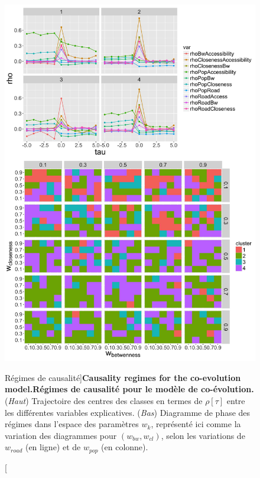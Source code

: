 \begin{figure}
	\includegraphics[width=\linewidth,height=0.93\textheight]{Figures/Final/7-2-2-fig-mesocoevolmodel-causality}
	\caption[Causality regimes][Régimes de causalité]{\textbf{Causality regimes for the co-evolution model.}\label{fig:mesocoevolmodel:causality}}{\textbf{Régimes de causalité pour le modèle de co-évolution.} (\textit{Haut}) Trajectoire des centres des classes en termes de $\rho[\tau]$ entre les différentes variables explicatives. (\textit{Bas}) Diagramme de phase des régimes dans l'espace des paramètres $w_k$, représenté ici comme la variation des diagrammes pour $(w_{bw},w_{cl})$, selon les variations de $w_{road}$ (en ligne) et de $w_{pop}$ (en colonne). \label{fig:mesocoevolmodel:causality}}
\end{figure}





